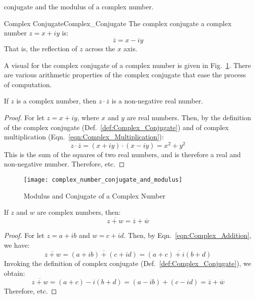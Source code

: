    conjugate and the modulus of a complex number.
    \begin{ldefinition}{Complex Conjugate}{Complex_Conjugate}
        The \gls{complex conjugate} a complex number $z=x+iy$ is:
        \begin{equation}
            \overline{z}=x-iy
        \end{equation}
        That is, the reflection of $z$ across the $x$ axis.
    \end{ldefinition}
    A visual for the complex conjugate of a complex number is given in
    Fig.~\ref{fig:Conj_and_Mod_of_Com_Num}. There are various
    arithmetic properties of the complex conjugate that ease the
    process of computation.
    \begin{theorem}
        If $z$ is a complex number, then $z\cdot\overline{z}$ is
        a non-negative real number.
    \end{theorem}
    \begin{proof}
        For let $z=x+iy$, where $x$ and $y$ are real numbers. Then, by
        the definition of the complex conjugate
        (Def.~\ref{def:Complex_Conjugate}) and of
        complex multiplication (Eqn.~\ref{eqn:Complex_Multiplication}):
        \begin{equation}
            z\cdot\overline{z}=(x+iy)\cdot(x-iy)
                              =x^{2}+y^{2}
        \end{equation}
        This is the sum of the squares of two real numbers, and is
        therefore a real and non-negative number. Therefore, etc.
    \end{proof}
    \begin{figure}[H]
        \centering
        \captionsetup{type=figure}
        \texttt{[image: complex\_number\_conjugate\_and\_modulus]}
        \caption{Modulus and Conjugate of a Complex Number}
        \label{fig:Conj_and_Mod_of_Com_Num}
    \end{figure}
    \begin{theorem}
        If $z$ and $w$ are complex numbers, then:
        \begin{equation}
            \overline{z+w}=\overline{z}+\overline{w}
        \end{equation}
    \end{theorem}
    \begin{proof}
        For let $z=a+ib$ and $w=c+id$. Then, by
        Eqn.~\ref{eqn:Complex_Addition}, we have:
        \begin{equation}
            \overline{z+w}=\overline{(a+ib)+(c+id)}
                          =\overline{(a+c)+i(b+d)}
        \end{equation}
        Invoking the definition of complex conjugate
        (Def.~\ref{def:Complex_Conjugate}), we obtain:
        \begin{equation}
            \overline{z+w}=(a+c)-i(b+d)
                          =(a-ib)+(c-id)
                          =\overline{z}+\overline{w}
        \end{equation}
        Therefore, etc.
    \end{proof}
